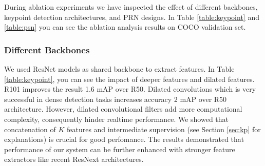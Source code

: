 \documentclass[runningheads]{llncs}
\begin{document}
During ablation experiments we have inspected the effect of different backbones, keypoint detection architectures, and PRN designs. In Table \ref{table:keypoint} and \ref{table:psn} you can see the ablation analysis results on COCO validation set.


\subsubsection{Different Backbones}
We used ResNet models\cite{He2016} as shared backbone to extract features. In Table \ref{table:keypoint}, you can see the impact of deeper features and dilated features. R101 improves the result 1.6 mAP over R50. Dilated convolutions \cite{Chen2016} which is very successful in dense detection tasks increases accuracy 2 mAP over R50 architecture. However, dilated convolutional filters add more computational complexity, consequently hinder realtime performance. We showed that concatenation of $K$ features and intermediate supervision (see Section \ref{sec:kp} for explanations) is crucial for good perfomance. The results demonstrated that performance of our system can be further enhanced with stronger feature extractors like recent ResNext \cite{Xie2016} architectures.


\begin{table}
\begin{center}
\caption{\textbf{Left:} Comparison of different keypoint models. \textbf{Right:} Performance of different backbone architectures. \textit{(no concat: no concatenation, no int: no intermediate supervision, dil: dilated, concat: concatenation)}}
\label{table:keypoint}
\quad
{}
\end{center}
\end{table}
\end{document}
